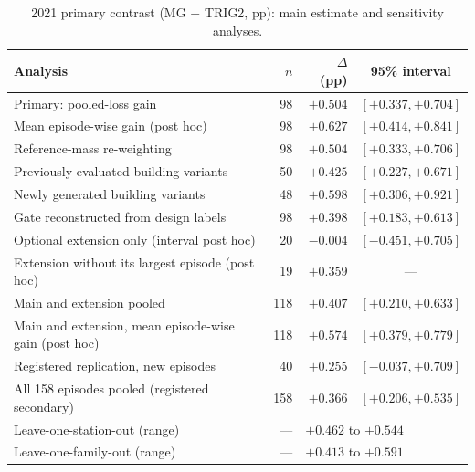 \begin{table}[!htbp]
\centering
\caption{2021 primary contrast (MG $-$ TRIG2, pp): main estimate and sensitivity analyses.}
\label{tab:sens}
\small
\begin{tabular}{lrrc}
\toprule
Analysis & $n$ & $\Delta$ (pp) & 95\% interval\\
\midrule
Primary: pooled-loss gain                  & 98  & $+0.504$ & $[+0.337, +0.704]$\\
Mean episode-wise gain (post hoc)          & 98  & $+0.627$ & $[+0.414, +0.841]$\\
Reference-mass re-weighting                & 98  & $+0.504$ & $[+0.333, +0.706]$\\
Previously evaluated building variants     & 50  & $+0.425$ & $[+0.227, +0.671]$\\
Newly generated building variants          & 48  & $+0.598$ & $[+0.306, +0.921]$\\
Gate reconstructed from design labels      & 98  & $+0.398$ & $[+0.183, +0.613]$\\
Optional extension only (interval post hoc) & 20 & $-0.004$ & $[-0.451, +0.705]$\\
Extension without its largest episode (post hoc) & 19 & $+0.359$ & ---\\
Main and extension pooled                  & 118 & $+0.407$ & $[+0.210, +0.633]$\\
Main and extension, mean episode-wise gain (post hoc) & 118 & $+0.574$ & $[+0.379, +0.779]$\\
Registered replication, new episodes        & 40  & $+0.255$ & $[-0.037, +0.709]$\\
All 158 episodes pooled (registered secondary) & 158 & $+0.366$ & $[+0.206, +0.535]$\\
Leave-one-station-out (range)              & --- & \multicolumn{2}{l}{$+0.462$ to $+0.544$}\\
Leave-one-family-out (range)               & --- & \multicolumn{2}{l}{$+0.413$ to $+0.591$}\\
\bottomrule
\end{tabular}
\end{table}


